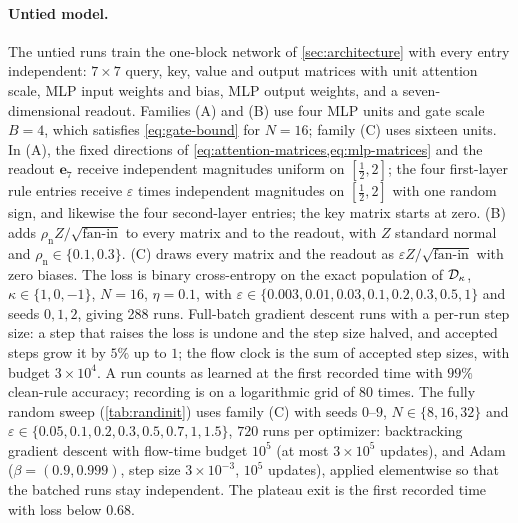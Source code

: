 \paragraph{Untied model.}
The untied runs train the one-block network of \cref{sec:architecture} with every entry independent:
$7\times7$ query, key, value and output matrices with unit attention scale, MLP input weights and bias, MLP output weights, and a seven-dimensional readout.
Families (A) and (B) use four MLP units and gate scale $B=4$, which satisfies \cref{eq:gate-bound} for $N=16$; family (C) uses sixteen units.
In (A), the fixed directions of \cref{eq:attention-matrices,eq:mlp-matrices} and the readout $\bm e_7$ receive independent magnitudes uniform on $[\tfrac{1}{2},2]$;
the four first-layer rule entries receive $\varepsilon$ times independent magnitudes on $[\tfrac{1}{2},2]$ with one random sign, and likewise the four second-layer entries;
the key matrix starts at zero. (B) adds $\rho_{\mathrm n}Z/\sqrt{\text{fan-in}}$ to every matrix and to the readout, with $Z$ standard normal and $\rho_{\mathrm n}\in\{0.1,0.3\}$.
(C) draws every matrix and the readout as $\varepsilon Z/\sqrt{\text{fan-in}}$ with zero biases.
The loss is binary cross-entropy on the exact population of $\mathcal D_{\kappa}$, $\kappa\in\{1,0,-1\}$, $N=16$, $\eta=0.1$,
with $\varepsilon\in\{0.003,0.01,0.03,0.1,0.2,0.3,0.5,1\}$ and seeds $0,1,2$, giving 288 runs.
Full-batch gradient descent runs with a per-run step size: a step that raises the loss is undone and the step size halved,
and accepted steps grow it by $5\%$ up to $1$; the flow clock is the sum of accepted step sizes, with budget $3\times10^4$.
A run counts as learned at the first recorded time with $99\%$ clean-rule accuracy; recording is on a logarithmic grid of 80 times.
The fully random sweep (\cref{tab:randinit}) uses family (C) with seeds $0$--$9$, $N\in\{8,16,32\}$ and $\varepsilon\in\{0.05,0.1,0.2,0.3,0.5,0.7,1,1.5\}$, $720$ runs per optimizer:
backtracking gradient descent with flow-time budget $10^5$ (at most $3\times10^5$ updates), and Adam ($\beta=(0.9,0.999)$, step size $3\times10^{-3}$, $10^5$ updates),
applied elementwise so that the batched runs stay independent. The plateau exit is the first recorded time with loss below $0.68$.

